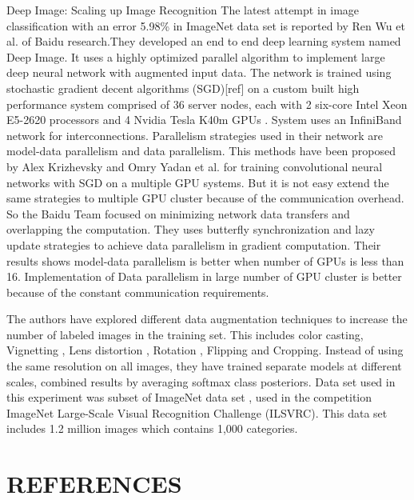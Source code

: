 \documentclass{article}
\begin{document}
\begin{section}{Deep Image: Scaling up Image Recognition}
The latest attempt in image classification with an error 5.98\% in ImageNet data set is reported by  Ren Wu et al.\cite{Wu2015} of Baidu research.They developed an end to end deep learning  system named Deep Image. It uses a highly optimized parallel algorithm  to implement large deep neural network with augmented input data. The network is trained using stochastic gradient decent algorithms (SGD)[ref] on a custom built high performance system comprised of 36 server nodes, each with 2 six-core Intel Xeon E5-2620 processors and 4 Nvidia Tesla K40m GPUs . System  uses an InfiniBand  network for interconnections. Parallelism strategies used in their network are model-data parallelism and data parallelism.  This methods have been proposed by Alex Krizhevsky \cite{Krizhevsky2014} and Omry Yadan et al.\cite{Yadan2013} for training convolutional neural networks with SGD on a  multiple GPU systems. But it is not easy extend the same strategies to multiple GPU cluster because of the communication overhead. So the  Baidu Team focused on minimizing network data transfers and overlapping the computation. They uses butterfly synchronization and lazy update strategies to achieve data parallelism in gradient computation. Their results shows model-data parallelism is better when number of GPUs is less than 16. Implementation of Data parallelism in large number  of GPU  cluster is better because of the constant communication requirements.
\par
The authors have explored different data augmentation techniques to increase the number of labeled images in the training set. This includes color casting, Vignetting , Lens distortion , Rotation , Flipping and  Cropping. Instead of using the same resolution on all images, they have trained separate models at different scales, combined results by averaging softmax class posteriors.
Data set used in this experiment was subset of ImageNet data set , used in the competition ImageNet Large-Scale Visual Recognition Challenge (ILSVRC). This data set includes 1.2 million images which contains 1,000 categories.

 
\end{section}


\section{REFERENCES}
\label{sec:survey}


\end{document}
